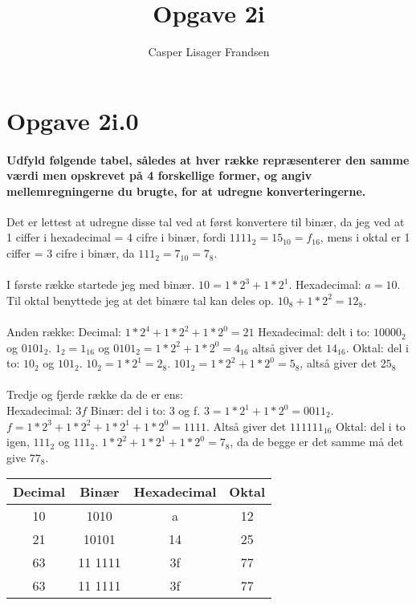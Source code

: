 \documentclass[a4paper]{article}
\title{Opgave 2i}
\author{Casper Lisager Frandsen}
\begin{document}
\maketitle

\section*{Opgave 2i.0}

\paragraph{Udfyld følgende tabel, således at hver række repræsenterer den samme værdi men opskrevet på 4 forskellige former, og angiv mellemregningerne du brugte, for at udregne konverteringerne.\\}

Det er lettest at udregne disse tal ved at først konvertere til binær, da jeg ved at 1 ciffer i hexadecimal = 4 cifre i binær, fordi $1111_2 = 15_{10} = f_{16}$, mens i oktal er 1 ciffer = 3 cifre i binær, da $111_2 = 7_{10} = 7_8$.\\\\
I første række startede jeg med binær. $10 = 1*2^3 + 1*2^1$. Hexadecimal: $a=10$. Til oktal benyttede jeg at det binære tal kan deles op. $10_8+1*2^2= 12_8$.\\\\
Anden række: Decimal: $1*2^4+1*2^2+1*2^0 = 21$ Hexadecimal: delt i to: $10000_2$ og $0101_2$. $1_2 = 1_{16} $ og $ 0101_2 = 1*2^2+1*2^0 = 4_{16}$ altså giver det $14_{16}$. Oktal: del i to: $10_2$ og $101_2$. $10_2 = 1*2^1 = 2_8$. $101_2 = 1*2^2+1*2^0= 5_8$, altså giver det $25_8$\\\\
Tredje og fjerde række da de er ens:\\
Hexadecimal: $3f$ Binær: del i to: 3 og f. $3 = 1*2^1+1*2^0 = 0011_2$. $f = 1*2^3+1*2^2+1*2^1+1*2^0 = 1111$. Altså giver det $11 1111_{16}$ Oktal: del i to igen, $111_2$ og $111_2$. $1*2^2+1*2^1+1*2^0 = 7_8$, da de begge er det samme må det give $77_8$.

\begin{center}

\begin{tabular}{|c|c|c|c|}
\hline Decimal & Binær & Hexadecimal & Oktal \\

\hline 10 & 1010 & a & 12\\

\hline 21 & 10101 & 14 & 25\\

\hline 63 & 11 1111 & 3f & 77\\

\hline 63 & 11 1111 & 3f & 77\\

\hline
\end{tabular}

\end{center}
\end{document}
